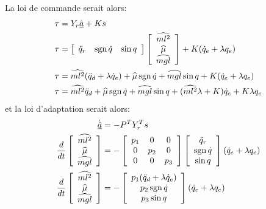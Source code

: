\begin{example}
La loi de commande serait alors:
\begin{align}
\tau &= Y_r \hat{\underline{a}} + 
K s \\
\tau &=
\left[ \begin{array}{ccc}
   \ddot{q}_r  &  \operatorname{sgn}{\dot{q}} & \sin q
\end{array} \right] 
\left[
\begin{array}{c}
 \widehat{ml^2} \\  \widehat{\mu} \\  \widehat{mgl}
\end{array}\right]
+ K ( \dot{q}_e + \lambda q_e ) \\
\tau &=
 \widehat{ml^2} (\ddot{q}_d + \lambda \dot{q}_e) +
 \widehat{\mu} \operatorname{sgn}{\dot{q}} + \widehat{mgl} \sin q
+ K ( \dot{q}_e + \lambda q_e ) \\
\tau &=
 \widehat{ml^2} \ddot{q}_d  +
 \widehat{\mu} \operatorname{sgn}{\dot{q}} + \widehat{mgl} \sin q
+ ( \widehat{ml^2} \lambda +  K ) \dot{q}_e + K \lambda q_e 
\end{align}
et la loi d'adaptation serait alors:
\begin{align}
\dot{\hat{\underline{a}}} &= - P^T Y_r^T s \\
\frac{d}{dt} \left[ \begin{array}{c}
 \widehat{ml^2} \\  \widehat{\mu} \\  \widehat{mgl}
\end{array} \right]
&= - \left[ \begin{array}{ccc}
p_1 &0&0 \\ 0& p_2 &0 \\ 0& 0& p_3
\end{array} \right]
\left[ \begin{array}{c}
   \ddot{q}_r  \\  \operatorname{sgn}{\dot{q}} \\ \sin q
\end{array} \right] ( \dot{q}_e + \lambda q_e ) \\
\frac{d}{dt} \left[ \begin{array}{c}
 \widehat{ml^2} \\  \widehat{\mu} \\  \widehat{mgl}
\end{array} \right]
&= - 
\left[ \begin{array}{c}
   p_1 (\ddot{q}_d + \lambda \dot{q}_e)  \\  p_2 \operatorname{sgn}{\dot{q}} \\ p_3 \sin q
\end{array} \right] ( \dot{q}_e + \lambda q_e )
\end{align}

\end{example}



